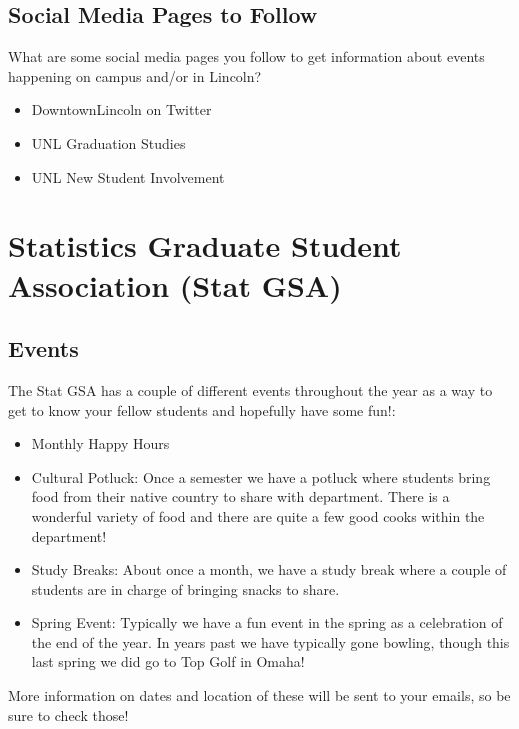 \documentclass[
  12pt,
]{book}
\providecommand{\tightlist}{%
  \setlength{\itemsep}{0pt}\setlength{\parskip}{0pt}}
\begin{document}
\hypertarget{social-media-pages-to-follow}{%
\section{Social Media Pages to Follow}\label{social-media-pages-to-follow}}

What are some social media pages you follow to get information about events happening on campus and/or in Lincoln?

\begin{itemize}
\tightlist
\item
  DowntownLincoln on Twitter
\item
  UNL Graduation Studies
\item
  UNL New Student Involvement
\end{itemize}

\hypertarget{statGSA}{%
\chapter{Statistics Graduate Student Association (Stat GSA)}\label{statGSA}}

\hypertarget{events}{%
\section{Events}\label{events}}

The Stat GSA has a couple of different events throughout the year as a way to get to know your fellow students and hopefully have some fun!:

\begin{itemize}
\tightlist
\item
  Monthly Happy Hours
\item
  Cultural Potluck: Once a semester we have a potluck where students bring food from their native country to share with department. There is a wonderful variety of food and there are quite a few good cooks within the department!
\item
  Study Breaks: About once a month, we have a study break where a couple of students are in charge of bringing snacks to share.
\item
  Spring Event: Typically we have a fun event in the spring as a celebration of the end of the year. In years past we have typically gone bowling, though this last spring we did go to Top Golf in Omaha!
\end{itemize}

More information on dates and location of these will be sent to your emails, so be sure to check those!
\end{document}
